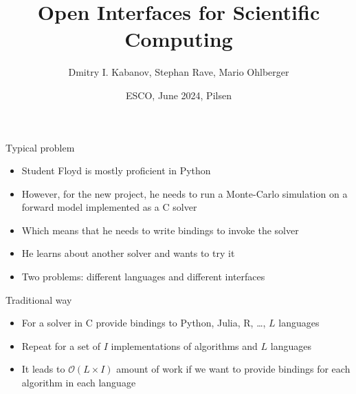 \documentclass[10pt, aspectratio=169, progressbar=frametitle]{beamer}
\title{Open Interfaces for Scientific Computing}
\author{Dmitry I. Kabanov, Stephan Rave, Mario Ohlberger}
\institute{Instute for Analysis une Numerics, University of Münster}
\date{ESCO, June 2024, Pilsen}
\begin{document}
\maketitle

\begin{frame}{Typical problem}
  \begin{itemize}
    \item Student Floyd is mostly proficient in Python
    \item However, for the new project, he needs to run a Monte-Carlo
          simulation on a forward model implemented as a C solver
    \item Which means that he needs to write bindings to invoke the solver
    \item He learns about another solver and wants to try it
    \item \alert{Two problems:} different languages and different interfaces
  \end{itemize}
\end{frame}

\begin{frame}{Traditional way}
  \begin{minipage}{0.45\textwidth}
    \begin{itemize}
      \item For a solver in C provide bindings to Python, Julia, R, \dots, $L$ languages
      \item Repeat for a set of $I$ implementations of algorithms and $L$ languages
      \item It leads to $\mathcal O(L \times I)$ amount of work if we want to provide
            bindings for each algorithm in each language
    \end{itemize}
  \end{minipage}\hfill
  \begin{minipage}{0.45\textwidth}
    
  \end{minipage}
\end{frame}
\end{document}
